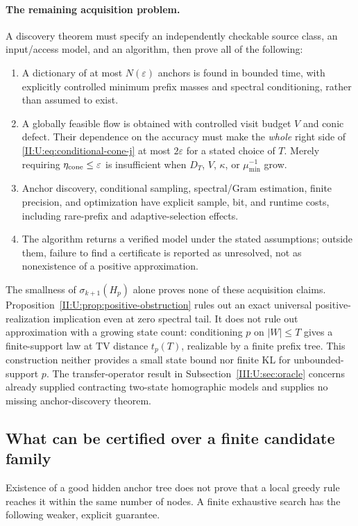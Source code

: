\paragraph{The remaining acquisition problem.}
A discovery theorem must specify an independently checkable source class,
an input/access model, and an algorithm, then prove all of the following:
\begin{enumerate}[label=(A\arabic*)]
\item A dictionary of at most $N(\varepsilon)$ anchors is found in
bounded time, with explicitly controlled minimum prefix masses and
spectral conditioning, rather than assumed to exist.
\item A globally feasible flow is obtained with controlled visit budget
$V$ and conic defect. Their dependence on the accuracy must make the
\emph{whole} right side of \eqref{II:U:eq:conditional-cone-j} at most
$2\varepsilon$ for a stated choice of $T$. Merely requiring
$\eta_{\rm cone}\le\varepsilon$ is insufficient when $D_T$, $V$,
$\kappa$, or $\mu_{\min}^{-1}$ grow.
\item Anchor discovery, conditional sampling, spectral/Gram estimation,
finite precision, and optimization have explicit sample, bit, and runtime
costs, including rare-prefix and adaptive-selection effects.
\item The algorithm returns a verified model under the stated assumptions;
outside them, failure to find a certificate is reported as unresolved,
not as nonexistence of a positive approximation.
\end{enumerate}
The smallness of $\sigma_{k+1}(H_p)$ alone proves none of these
acquisition claims. Proposition~\ref{II:U:prop:positive-obstruction} rules out
an exact universal positive-realization implication even at zero spectral
tail. It does not rule out approximation with a growing state count:
conditioning $p$ on $|W|\le T$ gives a finite-support law at TV distance
$t_p(T)$, realizable by a finite prefix tree. This construction neither
provides a small state bound nor finite KL for unbounded-support $p$.
The transfer-operator result in Subsection~\ref{III:U:sec:oracle} concerns
already supplied contracting two-state homographic models and supplies
no missing anchor-discovery theorem.


\subsection{What can be certified over a finite candidate family}
\label{II:U:sec:finite-family-search}
Existence of a good hidden anchor tree does not prove that a local greedy
rule reaches it within the same number of nodes. A finite exhaustive
search has the following weaker, explicit guarantee.

